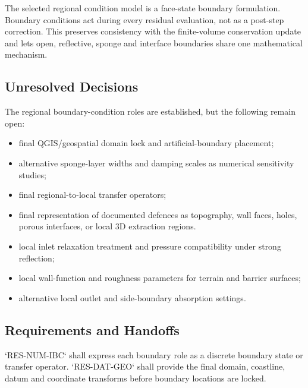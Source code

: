 
The selected regional condition model is a face-state boundary
formulation. Boundary conditions act during every residual evaluation,
not as a post-step correction. This preserves consistency with the
finite-volume conservation update and lets open, reflective, sponge and
interface boundaries share one mathematical mechanism.

\subsection{Unresolved Decisions}
\label{sec:res-mod-ibc-unresolved-decisions}


The regional boundary-condition roles are established, but the following
remain open:

\begin{itemize}
  \item final QGIS/geospatial domain lock and artificial-boundary
    placement;
  \item alternative sponge-layer widths and damping scales as numerical
    sensitivity studies;
  \item final regional-to-local transfer operators;
  \item final representation of documented defences as topography,
    wall faces, holes, porous interfaces, or local 3D extraction
    regions.
  \item local inlet relaxation treatment and pressure compatibility
    under strong reflection;
  \item local wall-function and roughness parameters for terrain and
    barrier surfaces;
  \item alternative local outlet and side-boundary absorption settings.
\end{itemize}

\subsection{Requirements and Handoffs}
\label{sec:res-mod-ibc-requirements}


`RES-NUM-IBC` shall express each boundary role as a discrete boundary
state or transfer operator. `RES-DAT-GEO` shall provide the final
domain, coastline, datum and coordinate transforms before boundary
locations are locked.

